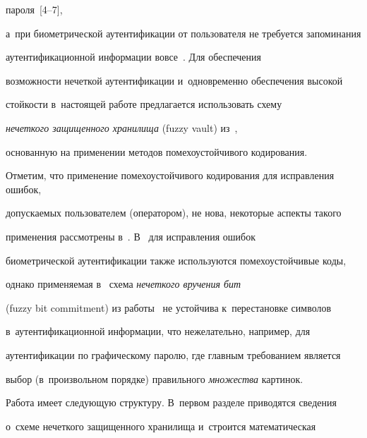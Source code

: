 пароля~[4--7],


а~при биометрической аутентификации от пользователя не требуется запоминания 


аутентификационной информации вовсе~\cite{Lal2016}. Для обеспечения 


возможности нечеткой аутентификации и~одновременно обеспечения высокой 


стойкости в~настоящей работе предлагается использовать схему 


\textit{нечеткого защищенного хранилища} (fuzzy vault) из~\cite{Jue2006}, 


основанную на применении методов помехоустойчивого кодирования. 


Отметим, что применение помехоустойчивого кодирования для исправления ошибок, 


допускаемых пользователем (оператором), не нова, некоторые аспекты такого 


применения рассмотрены в~\cite{Boya1983}. В~\cite{Hoa2014} для исправления ошибок 


биометрической аутентификации также используются помехоустойчивые коды, 


однако применяемая в~\cite{Hoa2014} схема \textit{нечеткого вручения бит} 


(fuzzy bit commitment) из работы~\cite{Jue1999} не устойчива к~перестановке символов 


в~аутентификационной информации, что нежелательно, например, для 


аутентификации по графическому паролю, где главным требованием является 


выбор (в~произвольном порядке) правильного \textit{множества} картинок.


{





}





Работа имеет следующую структуру. В~первом разделе приводятся сведения 


о~схеме нечеткого защищенного хранилища и~строится математическая\linebreak\vspace*{-12pt}





\pagebreak





